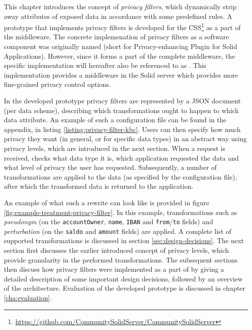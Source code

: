 \noindent This chapter introduces the concept of \textit{privacy filters}, which dynamically strip away attributes of exposed data in accordance with some predefined rules. A prototype that implements privacy filters is developed for the \acrlong{CSS}\footnote{\url{https://github.com/CommunitySolidServer/CommunitySolidServer}} as a part of the \middleware{} middleware. The concrete implemenation of privacy filters as a software component was originally named \mwprivacy{} (short for Privacy-enhancing Plugin for Solid Applications). However, since it forms a part of the complete middleware, the specific implementation will hereafter also be referenced to as \middleware{}. This implementation provides a middleware in the Solid server which provides more fine-grained privacy control options. 



\newpage
\noindent In the developed prototype privacy filters are represented by a JSON document (per data scheme), describing which transformations ought to happen to which data attribute. An example of such a configuration file can be found in the appendix, in listing \ref{listing:privacy-filter-kbc}. Users can then specify how much privacy they want (in general, or for specific data types) in an abstract way using privacy levels, which are introduced in the next section. When a request is received, \middleware{} checks what data type it is, which application requested the data and what level of privacy the user has requested. Subsequently, a number of transformations are applied to the data (as specified by the configuration file), after which the transformed data is returned to the application. 

An example of what such a rewrite can look like is provided in figure \ref{fig:example-treatment-privacy-filter}. In this example, transformations such as \textit{pseudonym} (on the \texttt{accountOwner}, \texttt{name}, \texttt{IBAN} and \texttt{from}/\texttt{to} fields) and \textit{perturbation} (on the \texttt{saldo} and \texttt{amount} fields) are applied. A complete list of supported transformations is discussed in section \ref{sec:design-decisions}. The next section first discusses the earlier introduced concept of privacy levels, which provide granularity in the performed transformations. The subsequent sections then discuss how privacy filters were implemented as a part of \middleware{} by giving a detailed description of some important design decisions, followed by an overview of the architecture. Evaluation of the developed prototype is discussed in chapter \ref{cha:evaluation}.



